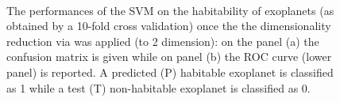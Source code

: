 \documentclass[
12pt, %
a4paper, %
oneside, %
headinclude,footinclude, %
BCOR5mm, %
]{scrartcl}
\begin{document}
\begin{figure}[h]
  \centering
{}\\
\caption{The performances of the SVM on the habitability of exoplanets (as obtained by a 10-fold cross validation) once the the dimensionality reduction via was applied (to 2 dimension): on the panel (a) the confusion matrix is given  while on panel (b) the ROC curve (lower panel) is reported. A predicted (P) habitable exoplanet is classified as 1 while a test (T) non-habitable exoplanet is classified as 0.}
\label{SVM+PCA_results}
\end{figure}
\end{document}

